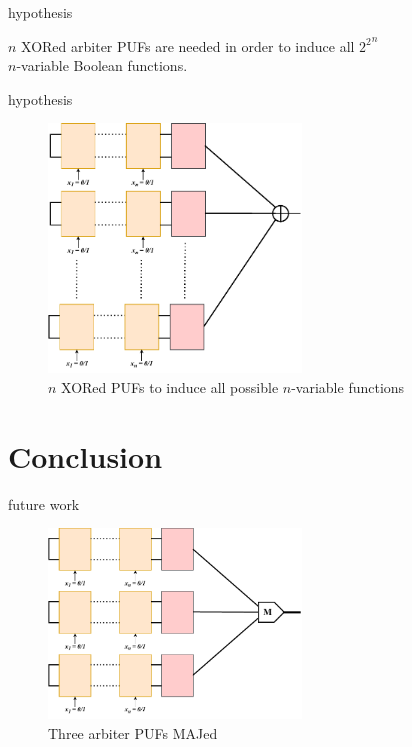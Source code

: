 \documentclass[10pt, compress]{beamer}
\begin{document}
\begin{frame}{hypothesis}
    \begin{center}
        $n$ XORed arbiter PUFs are needed in order to induce all ${2^2}^n$\\$n$-variable Boolean functions.
    \end{center}
\end{frame}




\begin{frame}{hypothesis}
    \begin{figure}
        \centering
        \includegraphics[width=0.6\textwidth]{figures/puf_n_xor.pdf}
        \caption{$n$ XORed PUFs to induce all possible $n$-variable functions}
    \end{figure}
\end{frame}

\section{Conclusion}

\begin{frame}{future work}
    \begin{figure}
        \centering
        \includegraphics[width=0.6\textwidth]{figures/puf_3_maj.pdf}
        \caption{Three arbiter PUFs MAJed}
    \end{figure}
\end{frame}
\end{document}

